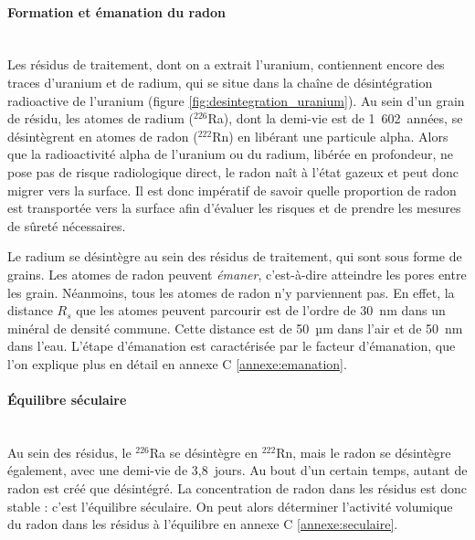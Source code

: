 \documentclass{article}
\begin{document}
\paragraph{Formation et émanation du radon \\ \\} Les résidus de traitement, dont on a extrait l’uranium, contiennent encore des traces d’uranium et de radium, qui se situe dans la chaîne de désintégration radioactive de l’uranium (figure \ref{fig:desintegration_uranium}). Au sein d’un grain de résidu, les atomes de radium ($^{226}$Ra), dont la demi-vie est de 1~602~années, se désintègrent en atomes de radon ($^{222}$Rn) en libérant une particule alpha. Alors que la radioactivité alpha de l’uranium ou du radium, libérée en profondeur, ne pose pas de risque radiologique direct, le radon naît à l’état gazeux et peut donc migrer vers la surface. Il est donc impératif de savoir quelle proportion de radon est transportée vers la surface afin d'évaluer les risques et de prendre les mesures de sûreté nécessaires.

Le radium se désintègre au sein des résidus de traitement, qui sont sous forme de grains. Les atomes de radon peuvent \emph{émaner}, c'est-à-dire atteindre les pores entre les grain. Néanmoins, tous les atomes de radon n'y parviennent pas. En effet, la distance $R_s$ que les atomes peuvent parcourir est de l’ordre de 30~nm dans un minéral de densité commune. Cette distance est de 50~µm dans l’air et de 50~nm dans l’eau. L'étape d'émanation est caractérisée par le facteur d'émanation, que l'on explique plus en détail en annexe C \ref{annexe:emanation}.

\paragraph{Équilibre séculaire \\ \\} Au sein des résidus, le $^{226}$Ra se désintègre en $^{222}$Rn, mais le radon se désintègre également, avec une demi-vie de 3,8~jours. Au bout d’un certain temps, autant de radon est créé que désintégré. La concentration de radon dans les résidus est donc stable : c’est l’équilibre séculaire. On peut alors déterminer l'activité volumique du radon dans les résidus à l'équilibre en annexe C \ref{annexe:seculaire}.
\end{document}
